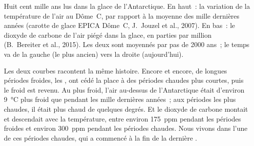 \begin{omfigure}

{\small Huit cent mille ans lus dans la glace de l'Antarctique. En haut~:
la variation de la température de l'air au Dôme~C, par rapport à la
moyenne des mille dernières années (carotte de glace EPICA Dôme~C,
J.~Jouzel et al., 2007). En bas~: le dioxyde de carbone de l'air piégé
dans la glace, en parties par million (B.~Bereiter et al., 2015). Les deux
sont moyennés par pas de \num{2000} ans~; le temps va de la gauche (le
plus ancien) vers la droite (aujourd'hui).}
\label{fig:g9:climate-past-and-present:icecore}
\end{omfigure}

Les deux courbes racontent la même histoire. Encore et encore, de longues
périodes froides, les , ont cédé la place à des périodes
chaudes plus courtes, puis le froid est revenu. Au plus froid, l'air
au-dessus de l'Antarctique était d'environ \qty{9}{\degreeCelsius} plus
froid que pendant les mille dernières années~; aux périodes les plus
chaudes, il était plus chaud de quelques degrés. Et le dioxyde de carbone
montait et descendait avec la température, entre environ \qty{175}{ppm}
pendant les périodes froides et environ \qty{300}{ppm} pendant les
périodes chaudes. Nous vivons dans l'une de ces périodes chaudes, qui a
commencé à la fin de la dernière .

